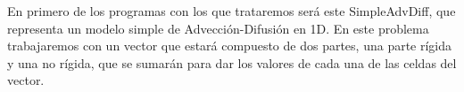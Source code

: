 En primero de los programas con los que trataremos será este SimpleAdvDiff, que representa un modelo simple de Advección-Difusión en 1D. En este problema trabajaremos con un vector que estará compuesto de dos partes, una parte rígida y una no rígida, que se sumarán para dar los valores de cada una de las celdas del vector.

